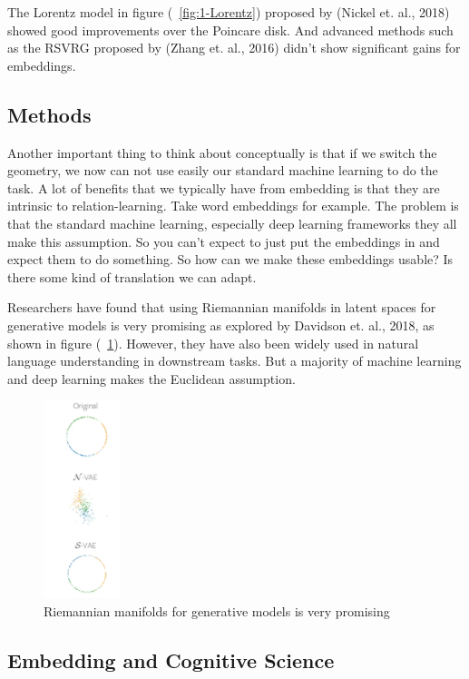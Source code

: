The Lorentz model in figure (~\ref{fig:1-Lorentz}) proposed by (Nickel et. al., 2018) showed good improvements over the Poincare disk. And advanced methods such as the RSVRG proposed by (Zhang et. al., 2016) didn't show significant gains for embeddings.  

\subsection{Methods}

Another important thing to think about conceptually is that if we switch the geometry, we now can not use easily our standard machine learning to do the task. A lot of benefits that we typically have from embedding is that they are intrinsic to relation-learning. Take word embeddings for example. The problem is that the standard machine learning, especially deep learning frameworks they all make this assumption. So you can't expect to just put the embeddings in and expect them to do something. So how can we make these embeddings usable? Is there some kind of translation we can adapt.

Researchers have found that using Riemannian manifolds in latent spaces for generative models is very promising as explored by Davidson et. al., 2018, as shown in figure (~\ref{fig:2-Davidson}). However, they have also been widely used in natural language understanding in downstream tasks. But a majority of machine learning and deep learning makes the Euclidean assumption.

\begin{figure}[htb]
  \centering
    \includegraphics[width=0.2\textwidth]{lectures/11-b/Images/2-Davidson.png}
    \caption{Riemannian manifolds for generative models is very promising}
    \label{fig:2-Davidson}
\end{figure}

\subsection{Embedding and Cognitive Science}

